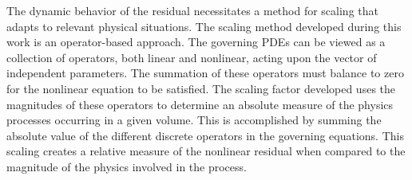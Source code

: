 The dynamic behavior of the residual necessitates a method for scaling that adapts to relevant physical situations.
The scaling method developed during this work is an operator-based approach.
The governing PDEs can be viewed as a collection of operators, both linear and nonlinear, acting upon the vector of independent parameters.
The summation of these operators must balance to zero for the nonlinear equation to be satisfied.
The scaling factor developed uses the magnitudes of these operators to determine an absolute measure of the physics processes occurring in a given volume.
This is accomplished by summing the absolute value of the different discrete operators in the governing equations.
This scaling creates a relative measure of the nonlinear residual when compared to the magnitude of the physics involved in the process.


